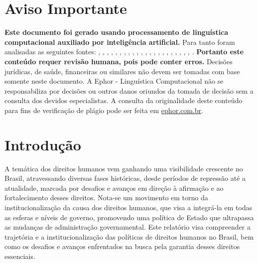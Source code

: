 \documentclass[
   article,       
   12pt,          
   oneside,       
   a4paper,       
   english,       
   brazil,        
   sumario=tradicional
   ]{abntex2}
\begin{document}
\frenchspacing 
\maketitle

\textual
\section{Aviso Importante}
\textbf{Este documento foi gerado usando processamento de linguística computacional auxiliado por inteligência artificial.} Para tanto foram analisadas as seguintes fontes:  \cite{A_CAUSA_E_AS_POLITICAS_DE_DIREITOS_HUMANOS_NO}, \cite{Ciclo_de_Politicas_Publicas_por_que_e_importa}, \cite{Conheca_o_ciclo_das_politicas_publicas__Polit}, \cite{Educacao_Inclusiva_Conheca_o_historico_da_leg}, \cite{Em_Buenos_Aires_Silvio_Almeida_defende_a_inst}, \cite{Entendendo_a_Tipologia_de_Politicas_Publicas_}, \cite{Escola_Nacional_de_Administracao_Publica__Wik}, \cite{Especialista_em_politicas_publicas_e_gestao_g}, \cite{FEDERALISMO_E_POLITICAS_PUBLICAS_NO_BRASIL_Ho}, \cite{Institucionalizacao_das_politicas_em_Direitos}, \cite{Ministerio_do_Planejamento_e_Orcamento__Wikip}, \cite{Ministro_defende_que_direitos_humanos_precisa}, \cite{Politica_conceito_politicas_publicas_e_partid}, \cite{Politica_publica__o_que_e_tipos_de_politicas_}, \cite{Politica_publica__Wikipedia_a_enciclopedia_li}, \cite{Politicas_publicas__Wikipedia_la_enciclopedia}, \cite{Politicas_Publicas_entenda_o_que_sao_para_que}, \cite{Politicas_Publicas_o_que_sao_e_para_que_serve}, \cite{Politicas_publicas_o_que_sao_e_para_que_serve}, \cite{Politicas_publicas_o_que_sao_quem_faz_e_tipos}, \cite{Politicas_publicas_o_que_sao_tipos_e_exemplos}, \cite{Revista_USP_119__Dossie_1_Democracia_e_politi}, \cite{TCU_Ciclo_das_politicas_publicas__Tudo_o_que_}.
\textbf{Portanto este conteúdo requer revisão humana, pois pode conter erros.} Decisões jurídicas, de saúde, financeiras ou similares não devem ser tomadas com base somente neste documento. A Ephor - Linguística Computacional não se responsabiliza por decisões ou outros danos oriundos da tomada de decisão sem a consulta dos devidos especialistas.
A consulta da originalidade deste conteúdo para fins de verificação de plágio pode ser feita em \href{http://www.ephor.com.br}{ephor.com.br}.
\section{Introdução}

A temática dos direitos humanos vem ganhando uma visibilidade crescente no Brasil, atravessando diversas fases históricas, desde períodos de repressão até a atualidade, marcada por desafios e avanços em direção à afirmação e ao fortalecimento desses direitos. Nota-se um movimento em torno da institucionalização da causa dos direitos humanos, que visa a integrá-la em todas as esferas e níveis de governo, promovendo uma política de Estado que ultrapassa as mudanças de administração governamental. Este relatório visa compreender a trajetória e a institucionalização das políticas de direitos humanos no Brasil, bem como os desafios e avanços enfrentados na busca pela garantia desses direitos essenciais.
\end{document}
